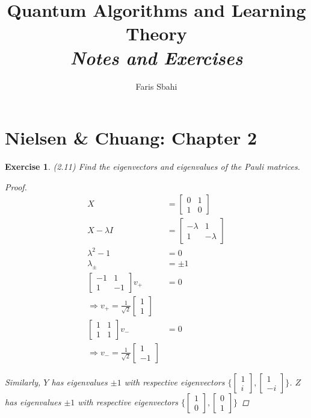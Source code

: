\documentclass[11pt]{article}
\date{}
\title{Quantum Algorithms and Learning Theory\\\textit{Notes and Exercises}}
\author{Faris Sbahi}
\newcommand\0{\mathbf{0}}
\newcommand\<{\langle}
\renewcommand\>{\rangle}
\renewcommand\implies{\Rightarrow}
\newtheorem{exercise}[theorem]{Exercise}
\begin{document}
\maketitle

\section{Nielsen \& Chuang: Chapter 2}

\begin{exercise} (2.11) Find the eigenvectors and eigenvalues of the Pauli matrices. 

\begin{proof}
	\begin{align*}
	X &= \begin{bmatrix}
 0 & 1 \\ 1 & 0	
 \end{bmatrix} \\
 X - \lambda I &= \begin{bmatrix}
 -\lambda & 1 \\ 1 & -\lambda	
 \end{bmatrix} \\
 \lambda^2 - 1 &= 0 \\
 \lambda_{\pm} &= \pm 1 \\
 \begin{bmatrix}
 -1 & 1 \\ 1 & -1
 \end{bmatrix} v_+ &= 0 \\
 \implies v_+ = \frac{1}{\sqrt{2}}\begin{bmatrix}
 1 \\ 1
 \end{bmatrix} \\
 \begin{bmatrix}
 1 & 1 \\ 1 & 1
 \end{bmatrix} v_- &= 0 \\
 \implies v_- = \frac{1}{\sqrt{2}}\begin{bmatrix}
 1 \\ -1
 \end{bmatrix}
	\end{align*}

Similarly, $Y$ has eigenvalues $\pm 1$ with respective eigenvectors $\Big\{ \begin{bmatrix}
 1 \\ i
 \end{bmatrix} , \begin{bmatrix}
 1 \\ -i
 \end{bmatrix} \Big\}$. $Z$ has eigenvalues $\pm 1$ with respective eigenvectors $\Big\{ \begin{bmatrix}
 1 \\ 0
 \end{bmatrix} , \begin{bmatrix}
 0 \\ 1
 \end{bmatrix} \Big\}$
\end{proof}
	
\end{exercise}
\end{document}
